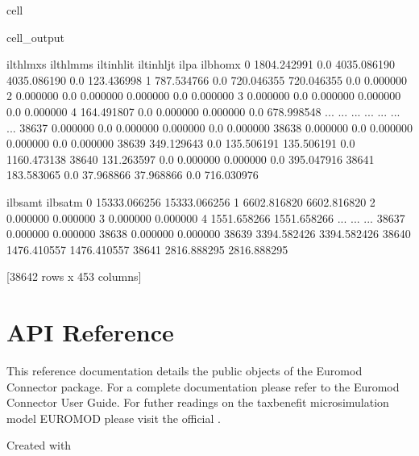 \documentclass[letterpaper,10pt,english]{sphinxmanual}
\begin{document}
\begin{sphinxuseclass}{cell}
\begin{sphinxuseclass}{cell_output}
\begin{sphinxVerbatim}[commandchars=\\\{\}]
        il\PYGZus{}thlmx\PYGZus{}s  il\PYGZus{}thlmm\PYGZus{}s   il\PYGZus{}tinhlit   il\PYGZus{}tinhljt  il\PYGZus{}pa     il\PYGZus{}bhomx  \PYGZbs{}
0      1804.242991         0.0  4035.086190  4035.086190    0.0   123.436998   
1       787.534766         0.0   720.046355   720.046355    0.0     0.000000   
2         0.000000         0.0     0.000000     0.000000    0.0     0.000000   
3         0.000000         0.0     0.000000     0.000000    0.0     0.000000   
4       164.491807         0.0     0.000000     0.000000    0.0   678.998548   
...            ...         ...          ...          ...    ...          ...   
38637     0.000000         0.0     0.000000     0.000000    0.0     0.000000   
38638     0.000000         0.0     0.000000     0.000000    0.0     0.000000   
38639   349.129643         0.0   135.506191   135.506191    0.0  1160.473138   
38640   131.263597         0.0     0.000000     0.000000    0.0   395.047916   
38641   183.583065         0.0    37.968866    37.968866    0.0   716.030976   

           il\PYGZus{}bsamt      il\PYGZus{}bsatm  
0      15333.066256  15333.066256  
1       6602.816820   6602.816820  
2          0.000000      0.000000  
3          0.000000      0.000000  
4       1551.658266   1551.658266  
...             ...           ...  
38637      0.000000      0.000000  
38638      0.000000      0.000000  
38639   3394.582426   3394.582426  
38640   1476.410557   1476.410557  
38641   2816.888295   2816.888295  

[38642 rows x 453 columns]
\end{sphinxVerbatim}

\end{sphinxuseclass}
\end{sphinxuseclass}
\sphinxstepscope


\section{API Reference}
\label{\detokenize{autoapi/index:api-reference}}\label{\detokenize{autoapi/index::doc}}
\sphinxAtStartPar
This reference documentation details the public objects of the Euromod Connector package. For a complete documentation please refer to the Euromod Connector User Guide.
For futher readings on the tax\sphinxhyphen{}benefit microsimulation model EUROMOD please visit the official .  %
\begin{footnote}[1]\sphinxAtStartFootnote
Created with 
%
\end{footnote}
\end{document}
